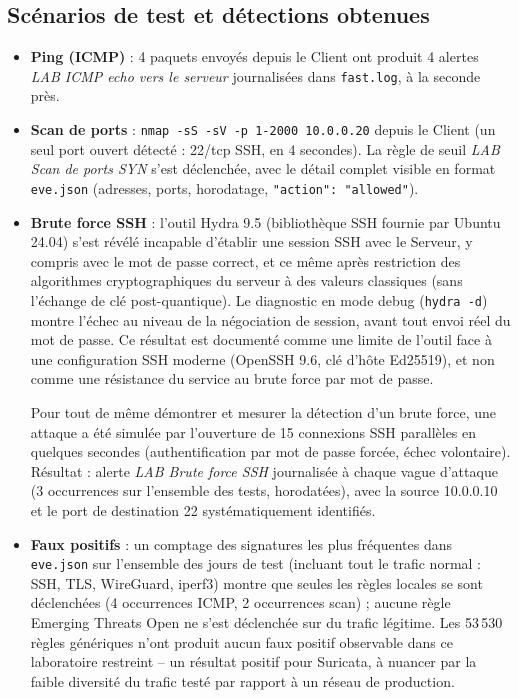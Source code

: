 \documentclass[11pt,a4paper]{article}
\begin{document}
\subsection{Scénarios de test et détections obtenues}
\begin{itemize}
  \item \textbf{Ping (ICMP)} : 4 paquets envoyés depuis le Client ont produit 4 alertes
        \emph{LAB ICMP echo vers le serveur} journalisées dans \texttt{fast.log}, à la seconde près.
  \item \textbf{Scan de ports} : \texttt{nmap -sS -sV -p 1-2000 10.0.0.20} depuis le Client (un seul
        port ouvert détecté : 22/tcp SSH, en 4 secondes). La règle de seuil \emph{LAB Scan de ports
        SYN} s'est déclenchée, avec le détail complet visible en format \texttt{eve.json}
        (adresses, ports, horodatage, \texttt{"action": "allowed"}).
  \item \textbf{Brute force SSH} : l'outil Hydra 9.5 (bibliothèque SSH fournie par Ubuntu 24.04)
        s'est révélé incapable d'établir une session SSH avec le Serveur, y compris avec le mot de
        passe correct, et ce même après restriction des algorithmes cryptographiques du serveur à
        des valeurs classiques (sans l'échange de clé post-quantique). Le diagnostic en mode debug
        (\texttt{hydra -d}) montre l'échec au niveau de la négociation de session, avant tout envoi
        réel du mot de passe. Ce résultat est documenté comme une limite de l'outil face à une
        configuration SSH moderne (OpenSSH 9.6, clé d'hôte Ed25519), et non comme une résistance du
        service au brute force par mot de passe.

        Pour tout de même démontrer et mesurer la détection d'un brute force, une attaque a été
        simulée par l'ouverture de 15 connexions SSH parallèles en quelques secondes
        (authentification par mot de passe forcée, échec volontaire). Résultat : alerte \emph{LAB
        Brute force SSH} journalisée à chaque vague d'attaque (3 occurrences sur l'ensemble des
        tests, horodatées), avec la source 10.0.0.10 et le port de destination 22 systématiquement
        identifiés.
  \item \textbf{Faux positifs} : un comptage des signatures les plus fréquentes dans
        \texttt{eve.json} sur l'ensemble des jours de test (incluant tout le trafic normal : SSH,
        TLS, WireGuard, iperf3) montre que seules les règles locales se sont déclenchées (4
        occurrences ICMP, 2 occurrences scan) ; aucune règle Emerging Threats Open ne s'est
        déclenchée sur du trafic légitime. Les 53\,530 règles génériques n'ont produit aucun faux
        positif observable dans ce laboratoire restreint -- un résultat positif pour Suricata, à
        nuancer par la faible diversité du trafic testé par rapport à un réseau de production.
\end{itemize}
\end{document}
